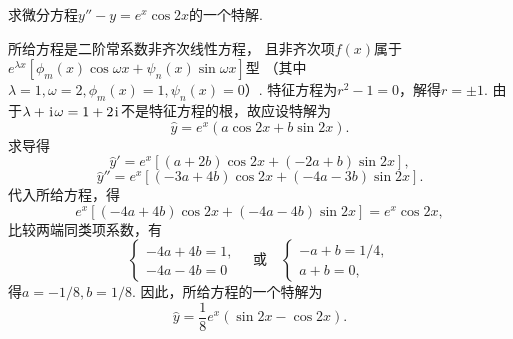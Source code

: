 \begin{example}
求微分方程\(y'' - y = e^x \cos2x\)的一个特解.
\begin{solution}
所给方程是二阶常系数非齐次线性方程，
且非齐次项\(f(x)\)属于\(e^{\lambda x} [\phi_m(x) \cos\omega x + \psi_n(x) \sin\omega x]\)型
（其中\(\lambda=1,
\omega=2,
\phi_m(x) = 1,
\psi_n(x) = 0\)）.
特征方程为\(r^2-1=0\)，解得\(r=\pm1\).
由于\(\lambda+\kern1pt\mathrm{i}\kern1pt\omega=1+2\kern1pt\mathrm{i}\kern1pt\)不是特征方程的根，故应设特解为\begin{equation*}
	\hat{y} = e^x (a \cos2x + b \sin2x).
\end{equation*}
求导得\begin{equation*}
	\hat{y}' = e^x [(a+2b) \cos2x + (-2a+b) \sin2x],
\end{equation*}\begin{equation*}
	\hat{y}'' = e^x [(-3a+4b) \cos2x + (-4a-3b) \sin2x].
\end{equation*}
代入所给方程，得\begin{equation*}
	e^x [(-4a+4b) \cos2x + (-4a-4b) \sin2x]
	= e^x \cos2x,
\end{equation*}
比较两端同类项系数，有\begin{equation*}
	\left\{ \begin{array}{l}
		-4a+4b=1, \\
		-4a-4b=0
	\end{array} \right.
	\quad\text{或}\quad
	\left\{ \begin{array}{l}
		-a+b=1/4, \\
		a+b=0,
	\end{array} \right.
\end{equation*}
得\(a = -1/8,
b = 1/8\).
因此，所给方程的一个特解为\begin{equation*}
	\hat{y} = \frac{1}{8} e^x (\sin2x - \cos2x).
\end{equation*}
\end{solution}
\end{example}

